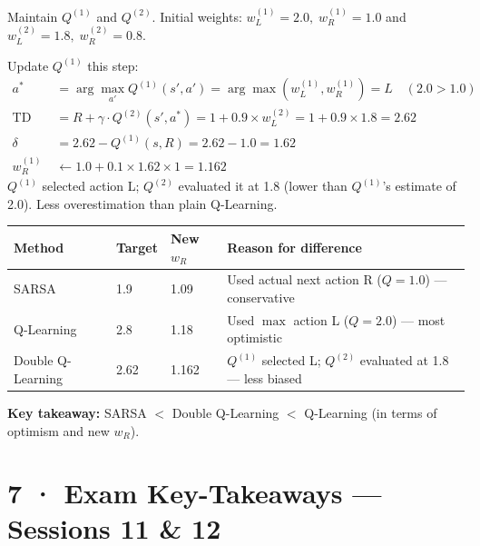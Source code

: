 \documentclass[11pt,a4paper]{article}
\begin{document}
\begin{tcolorbox}[exam={Method 3 — Double Q-Learning (two estimators)}]
Maintain $Q^{(1)}$ and $Q^{(2)}$. Initial weights:
$w^{(1)}_L = 2.0,\; w^{(1)}_R = 1.0$ \quad and \quad $w^{(2)}_L = 1.8,\; w^{(2)}_R = 0.8$.

\medskip
Update $Q^{(1)}$ this step:
\begin{align*}
  a^* &= \arg\max_{a'} Q^{(1)}(s', a') = \arg\max(w^{(1)}_L, w^{(1)}_R) = L \quad (2.0 > 1.0) \\
  \text{TD target} &= R + \gamma \cdot Q^{(2)}(s', a^*) = 1 + 0.9 \times w^{(2)}_L = 1 + 0.9 \times 1.8 = 2.62 \\
  \delta &= 2.62 - Q^{(1)}(s, R) = 2.62 - 1.0 = 1.62 \\
  w^{(1)}_R &\leftarrow 1.0 + 0.1 \times 1.62 \times 1 = \mathbf{1.162}
\end{align*}
$Q^{(1)}$ selected action L; $Q^{(2)}$ evaluated it at 1.8 (lower than $Q^{(1)}$'s estimate of 2.0).
Less overestimation than plain Q-Learning.
\end{tcolorbox}

\begin{tcolorbox}[bold={Comparison — Three Methods}]
\begin{center}
\begin{tabular}{p{4cm}p{2.5cm}p{2.5cm}p{6cm}}
\toprule
\textbf{Method} & \textbf{Target} & \textbf{New $w_R$} & \textbf{Reason for difference} \\
\midrule
SARSA & 1.9 & 1.09 & Used actual next action R ($Q=1.0$) — conservative \\
Q-Learning & 2.8 & 1.18 & Used $\max$ action L ($Q=2.0$) — most optimistic \\
Double Q-Learning & 2.62 & 1.162 & $Q^{(1)}$ selected L; $Q^{(2)}$ evaluated at 1.8 — less biased \\
\bottomrule
\end{tabular}
\end{center}
\textbf{Key takeaway:} SARSA $<$ Double Q-Learning $<$ Q-Learning (in terms of optimism and new $w_R$).
\end{tcolorbox}

\section*{7 · Exam Key-Takeaways — Sessions 11 \& 12}
\end{document}
